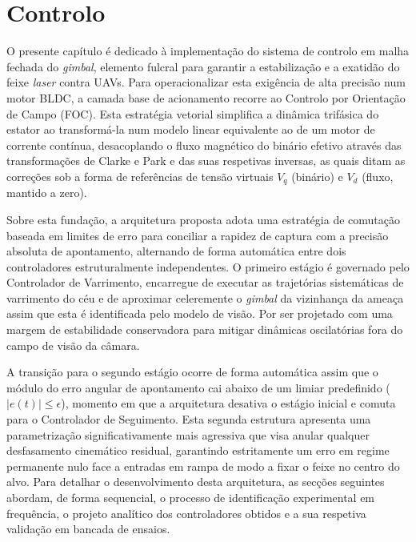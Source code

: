 
\chapter{Controlo} %
\label{chap:Chapter6} 


O presente capítulo é dedicado à implementação do sistema de controlo em malha fechada do \emph{gimbal}, elemento fulcral para garantir a estabilização e a exatidão do feixe \emph{laser} contra \acp{UAV}. Para operacionalizar esta exigência de alta precisão num motor \ac{BLDC}, a camada base de acionamento recorre ao Controlo por Orientação de Campo (\ac{FOC}). Esta estratégia vetorial simplifica a dinâmica trifásica do estator ao transformá-la num modelo linear equivalente ao de um motor de corrente contínua, desacoplando o fluxo magnético do binário efetivo através das transformações de Clarke e Park e das suas respetivas inversas, as quais ditam as correções sob a forma de referências de tensão virtuais $V_q$ (binário) e $V_d$ (fluxo, mantido a zero).

Sobre esta fundação, a arquitetura proposta adota uma estratégia de comutação baseada em limites de erro para conciliar a rapidez de captura com a precisão absoluta de apontamento, alternando de forma automática entre dois controladores estruturalmente independentes. O primeiro estágio é governado pelo Controlador de Varrimento, encarregue de executar as trajetórias sistemáticas de varrimento do céu e de aproximar celeremente o \emph{gimbal} da vizinhança da ameaça assim que esta é identificada pelo modelo de visão. Por ser projetado com uma margem de estabilidade conservadora para mitigar dinâmicas oscilatórias fora do campo de visão da câmara.

A transição para o segundo estágio ocorre de forma automática assim que o módulo do erro angular de apontamento cai abaixo de um limiar predefinido ($|e(t)| \le \epsilon$), momento em que a arquitetura desativa o estágio inicial e comuta para o Controlador de Seguimento. Esta segunda estrutura apresenta uma parametrização significativamente mais agressiva que visa anular qualquer desfasamento cinemático residual, garantindo estritamente um erro em regime permanente nulo face a entradas em rampa de modo a fixar o feixe no centro do alvo. Para detalhar o desenvolvimento desta arquitetura, as secções seguintes abordam, de forma sequencial, o processo de identificação experimental em frequência, o projeto analítico dos controladores obtidos e a sua respetiva validação em bancada de ensaios.

